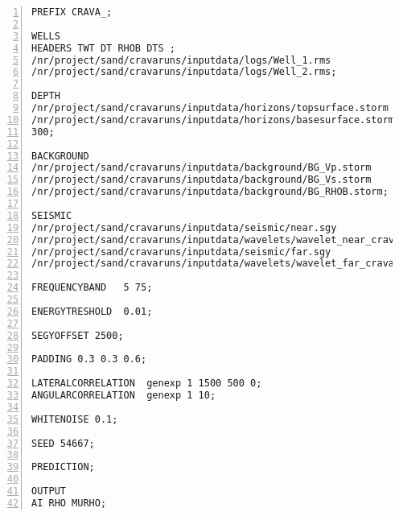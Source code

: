 \documentclass[screen,citenumeric,long,10pt]{nrdoc}
\begin{document}
\begin{small}
\begin{Verbatim}[numbers=left]
PREFIX CRAVA_;

WELLS
HEADERS TWT DT RHOB DTS ;
/nr/project/sand/cravaruns/inputdata/logs/Well_1.rms
/nr/project/sand/cravaruns/inputdata/logs/Well_2.rms;

DEPTH
/nr/project/sand/cravaruns/inputdata/horizons/topsurface.storm
/nr/project/sand/cravaruns/inputdata/horizons/basesurface.storm
300;

BACKGROUND
/nr/project/sand/cravaruns/inputdata/background/BG_Vp.storm
/nr/project/sand/cravaruns/inputdata/background/BG_Vs.storm
/nr/project/sand/cravaruns/inputdata/background/BG_RHOB.storm;

SEISMIC
/nr/project/sand/cravaruns/inputdata/seismic/near.sgy                  15 .35
/nr/project/sand/cravaruns/inputdata/wavelets/wavelet_near_crava.txt             -0.80
/nr/project/sand/cravaruns/inputdata/seismic/far.sgy                   40 .39
/nr/project/sand/cravaruns/inputdata/wavelets/wavelet_far_crava.txt              -0.90;

FREQUENCYBAND   5 75;

ENERGYTRESHOLD  0.01;

SEGYOFFSET 2500;

PADDING 0.3 0.3 0.6;

LATERALCORRELATION  genexp 1 1500 500 0;
ANGULARCORRELATION  genexp 1 10;

WHITENOISE 0.1;

SEED 54667;

PREDICTION;

OUTPUT
AI RHO MURHO;
\end{Verbatim}
\end{small}



\end{document}
